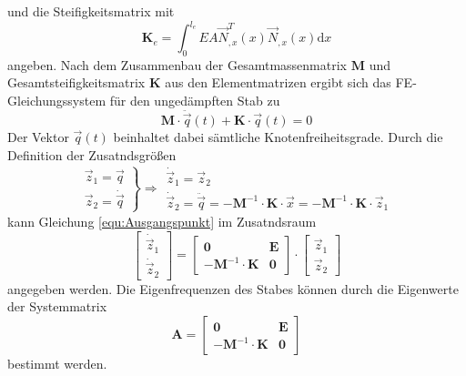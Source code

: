 \documentclass[a4paper,10pt,twoside]{article}
\numberwithin{equation}{section} %
\numberwithin{figure}{section}   %
\numberwithin{table}{section}    %
\begin{document}
	und die Steifigkeitsmatrix mit
	\begin{equation}\label{equ:Stab-Ke-Matrix}
	\mathbf{K}_{e} = \int_{0}^{l_{e}} E A \vec{N}_{,x}^{T}(x) \vec{N}_{,x}(x) \mathrm{d}x
	\end{equation}
	angeben. Nach dem Zusammenbau der Gesamtmassenmatrix $ \mathbf{M} $ und Gesamtsteifigkeitsmatrix $ \mathbf{K} $ aus den  Elementmatrizen ergibt sich das FE-Gleichungssystem für den ungedämpften Stab zu
	\begin{equation}\label{equ:Ausgangspunkt}
	\mathbf{M} \cdot \ddot{\vec{q}}(t) + \mathbf{K} \cdot \vec{q}(t) = 0
	\end{equation}
	Der Vektor $\vec{q}(t)$ beinhaltet dabei sämtliche Knotenfreiheitsgrade. Durch die Definition der Zusatndsgrößen
	\begin{equation}\label{equ:Ansatz-in-Systemmatrix}
	\left. 
	\begin{array}{c}
	\vec{z}_{1} = \vec{q} \\
	\vec{z}_{2} = \dot{\vec{q}}
	\end{array}
	\right\rbrace \Rightarrow	
	\begin{array}{l}
	\dot{\vec{z}}_{1} = \vec{z}_{2} \\
	\dot{\vec{z}}_{2} = \ddot{\vec{q}} = - \mathbf{M}^{-1} \cdot \mathbf{K} \cdot \vec{x} = - \mathbf{M}^{-1} \cdot \mathbf{K} \cdot \vec{z}_{1}
	\end{array}
	\end{equation}
	kann Gleichung \eqref{equ:Ausgangspunkt} im Zusatndsraum 
	\begin{equation}\label{equ:1st-Ausgangspunkt}
	\left[ 
	\begin{array}{c}
	\dot{\vec{z}}_{1}\\
	\dot{\vec{z}}_{2}
	\end{array}
	\right] 
	=
	\left[ 
	\begin{array}{cc}
	\mathbf{0}                        & \mathbf{E} \\
	-\mathbf{M}^{-1} \cdot \mathbf{K} & \mathbf{0}
	\end{array}
	\right]
	\cdot
	\left[ 
	\begin{array}{c}
	\vec{z}_{1}\\
	\vec{z}_{2}
	\end{array}
	\right] 
	\end{equation}
	angegeben werden. Die Eigenfrequenzen des Stabes können durch die Eigenwerte der Systemmatrix
	\begin{equation}\label{equ:Systemmatrix}
	\mathbf{A}
	=
	\left[ 
	\begin{array}{cc}
	\mathbf{0}                        & \mathbf{E} \\
	-\mathbf{M}^{-1} \cdot \mathbf{K} & \mathbf{0}
	\end{array}
	\right]
	\end{equation}
	bestimmt werden.
	
\end{document}
